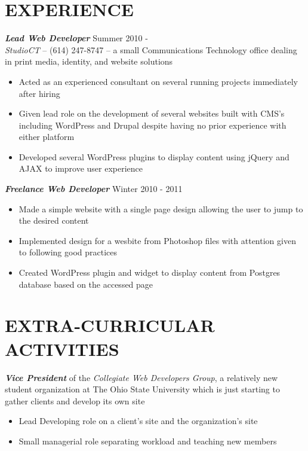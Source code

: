 \documentclass[line,margin,letterpaper]{res}
\begin{document}
\begin{resume}
\section{\uppercase{Experience}} {\sl\textbf{Lead Web Developer}} \hfill Summer 2010 - \\
	\emph{StudioCT} -- (614) 247-8747 -- a small Communications Technology office dealing in print media, identity, 
	and website solutions 
	\vspace{5pt}
	\begin{itemize}  
	    \item Acted as an experienced consultant on several running projects immediately after hiring
	    \item Given lead role on the development of several websites built with 
		CMS's including WordPress and Drupal despite having no prior experience with either platform
	    \item Developed several WordPress plugins to display content using jQuery and AJAX to
		improve user experience
	\end{itemize}

	{\sl\textbf{Freelance Web Developer}} \hfill Winter 2010 - 2011 \\
	\vspace{-8pt}
	 \begin{itemize}  
	     \item Made a simple website with a single page design allowing the user to jump to the desired content
	     \item Implemented design for a wesbite from Photoshop files with attention given to following good practices
	     \item Created WordPress plugin and widget to display content from Postgres database based on the accessed page
	 \end{itemize} 
                 
\section{\uppercase{Extra-Curricular Activities}}             
    \emph{\textbf{Vice President}} of the \emph{Collegiate Web Developers Group}, a relatively new student organization at The Ohio State University which is just starting to gather clients and develop its own site \\
    \vspace{-8pt}
	\begin{itemize}
	    \item Lead Developing role on a client's site and the organization's site
	    \item Small managerial role separating workload and teaching new members
	\end{itemize}
 
\end{resume}
\end{document}
